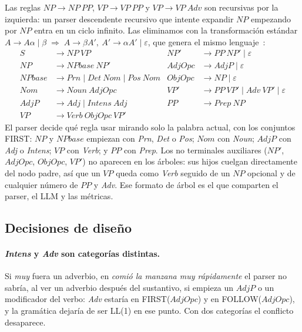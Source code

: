 Las reglas $NP \to NP\ PP$, $VP \to VP\ PP$ y $VP \to VP\ \textit{Adv}$ son recursivas por la
izquierda: un parser descendente recursivo que intente expandir $NP$ empezando por $NP$ entra en
un ciclo infinito. Las eliminamos con la transformación estándar
$A \to A\alpha \mid \beta \;\Rightarrow\; A \to \beta A',\ A' \to \alpha A' \mid \varepsilon$,
que genera el mismo lenguaje~\cite{hmu}:
\begin{align*}
  S      &\to NP\ VP                       & NP'    &\to PP\ NP' \mid \varepsilon \\
  NP     &\to NPbase\ NP'                  & AdjOpc &\to AdjP \mid \varepsilon \\
  NPbase &\to \textit{Prn} \mid \textit{Det}\ Nom \mid \textit{Pos}\ Nom
                                           & ObjOpc &\to NP \mid \varepsilon \\
  Nom    &\to \textit{Noun}\ AdjOpc        & VP'    &\to PP\ VP' \mid \textit{Adv}\ VP' \mid \varepsilon \\
  AdjP   &\to \textit{Adj} \mid \textit{Intens}\ \textit{Adj}
                                           & PP     &\to \textit{Prep}\ NP \\
  VP     &\to \textit{Verb}\ ObjOpc\ VP'
\end{align*}
El parser decide qué regla usar mirando solo la palabra actual, con los conjuntos FIRST:
$NP$ y $NPbase$ empiezan con \textit{Prn}, \textit{Det} o \textit{Pos}; $Nom$ con
\textit{Noun}; $AdjP$ con \textit{Adj} o \textit{Intens}; $VP$ con \textit{Verb}; y $PP$ con
\textit{Prep}. Los no terminales auxiliares ($NP'$, $AdjOpc$, $ObjOpc$, $VP'$) no aparecen en
los árboles: sus hijos cuelgan directamente del nodo padre, así que un $VP$ queda como
\textit{Verb} seguido de un $NP$ opcional y de cualquier número de $PP$ y \textit{Adv}. Ese
formato de árbol es el que comparten el parser, el LLM y las métricas.

\subsection{Decisiones de diseño}

\paragraph{\textit{Intens} y \textit{Adv} son categorías distintas.} Si \emph{muy} fuera un
adverbio, en \emph{comió la manzana muy rápidamente} el parser no sabría, al ver un adverbio
después del sustantivo, si empieza un $AdjP$ o un modificador del verbo: \textit{Adv} estaría en
FIRST($AdjOpc$) y en FOLLOW($AdjOpc$), y la gramática dejaría de ser LL(1) en ese punto. Con dos
categorías el conflicto desaparece.

